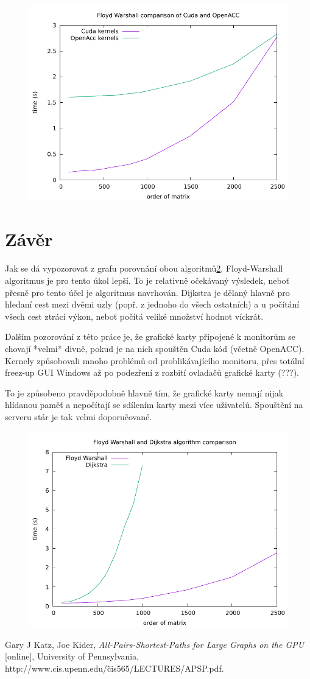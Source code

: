 \documentclass[11pt, fleqn]{article}
\begin{document}
\begin{figure}
  \centering
  \includegraphics[width=.7\linewidth]{../results/FW_Cuda3.pdf}
  \label{fig:fw5}
\end{figure}


\section{Závěr}

Jak se dá vypozorovat z grafu porovnání obou algoritmů\ref{fig:comp}, Floyd-Warshall algoritmus je pro tento úkol lepší. To je relativně očekávaný výsledek, neboť přesně pro tento účel je algoritmus navrhován. Dijkstra je dělaný hlavně pro hledaní cest mezi dvěmi uzly (popř. z jednoho do všech ostatních) a u počítání všech cest ztrácí výkon, neboť počítá veliké množství hodnot víckrát.

Dalším pozorování z této práce je, že grafické karty připojené k monitorům se chovají *velmi* divně, pokud je na nich spouštěn Cuda kód (včetně OpenACC). Kernely způsobovali mnoho problémů od problikávajícího monitoru, přes totální freez-up GUI Windows až po podezření z rozbití ovladačů grafické karty (???).

To je způsobeno pravděpodobně hlavně tím, že grafické karty nemají nijak hlídanou paměť a nepočítají se sdílením karty mezi více uživatelů. Spouštění na serveru stár je tak velmi doporučované.

\begin{figure}
  \centering
  \includegraphics[width=.7\linewidth]{../results/Comparison.pdf}
  \label{fig:comp}
\end{figure}


\begin{thebibliography}{9}

\bibitem{}
  Gary J Katz, Joe Kider,
  \textit{All-Pairs-Shortest-Paths for Large Graphs on the GPU} [online],
  University of Pennsylvania,
  http://www.cis.upenn.edu/\~cis565/LECTURES/APSP.pdf.

\end{thebibliography}
\end{document}
